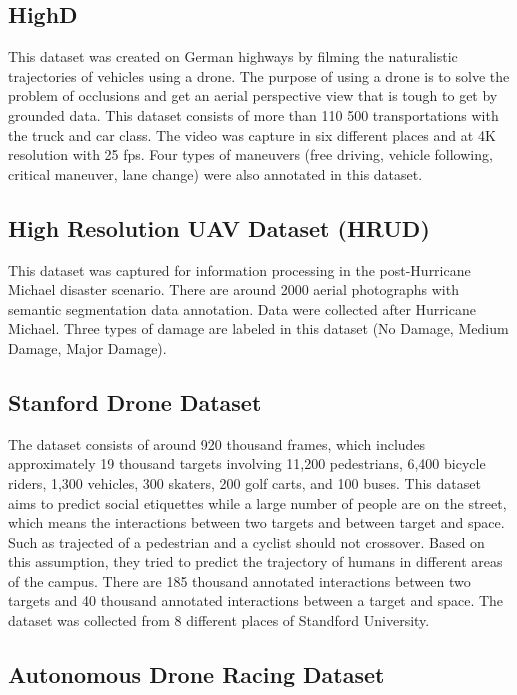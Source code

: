 \subsection{HighD}
This dataset was created on German highways by filming the naturalistic trajectories of vehicles using a drone. The purpose of using a drone is to solve the problem of occlusions and get an aerial perspective view that is tough to get by grounded data. This dataset consists of more than 110 500 transportations with the truck and car class. The video was capture in six different places and at 4K resolution with 25 fps. Four types of maneuvers (free driving, vehicle following, critical maneuver, lane change) were also annotated in this dataset.

\subsection{High Resolution UAV Dataset (HRUD)}
This dataset was captured for information processing in the post-Hurricane Michael disaster scenario. There are around 2000 aerial photographs with semantic segmentation data annotation. Data were collected after Hurricane Michael. Three types of damage are labeled in this dataset (No Damage, Medium Damage, Major Damage).


\subsection{Stanford Drone Dataset}

The dataset consists of around 920 thousand frames, which includes approximately 19 thousand targets involving 11,200 pedestrians, 6,400 bicycle riders, 1,300 vehicles, 300 skaters, 200 golf carts, and 100 buses. This dataset aims to predict social etiquettes while a large number of people are on the street, which means the interactions between two targets and between target and space. Such as trajected of a pedestrian and a cyclist should not crossover. Based on this assumption, they tried to predict the trajectory of humans in different areas of the campus. There are 185 thousand annotated interactions between two targets and 40 thousand annotated interactions between a target and space. The dataset was collected from 8 different places of Standford University.


\subsection{Autonomous Drone Racing Dataset}

